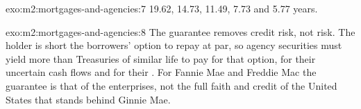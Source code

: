 \begin{solution}{exo:m2:mortgages-and-agencies:7}
19.62, 14.73, 11.49, 7.73 and 5.77 years.
\end{solution}

\begin{solution}{exo:m2:mortgages-and-agencies:8}
The guarantee removes credit risk, not  risk. The holder is short
the borrowers' option to repay at par, so agency securities must yield more than
Treasuries of similar life to pay for that option, for their uncertain cash
flows and for their . For Fannie Mae and Freddie Mac the
guarantee is that of the enterprises, not the full faith and credit of the
United States that stands behind Ginnie Mae.
\end{solution}

